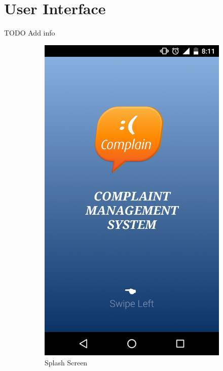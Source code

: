 \documentclass{article}
\begin{document}
	\section{User Interface}
	TODO Add info \\
	    \begin{figure}[H]
      \centering
      \begin{subfigure}{.4\textwidth}
          \centering
          \includegraphics[width=0.9\linewidth]{splash.png}
          \caption{Splash Screen}
          \label{fig:sub1}
      \end{subfigure}%
      \begin{subfigure}{.4\textwidth}
          \centering

\end{subfigure}
\end{figure}
\end{document}
